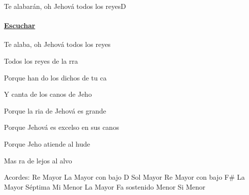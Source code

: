 \documentclass[12pt, spanish]{book}
\begin{document}
    \begin{song}{Te alabarán, oh Jehová todos los reyes}{D}
        {} %
        {}
        {} %
        {}
        \ifChordBk
        \paragraph{\mbox{}\hfill\protect\href{https://open.spotify.com/intl-es/track/0WdOF259XbU53KiczkpEBu}{Escuchar}\mbox{}\hfill}
        \fi

        \begin{SBOpGroup}
            Te alaba, oh Jehová todos los reyes

            Todos los reyes de la rra

            Porque han do los dichos de tu ca

            Y canta de los canos de Jeho
        \end{SBOpGroup}

        \begin{SBChorus}
            Porque la ria de Jehová es grande

            Porque Jehová es excelso en sus canos

            Porque Jeho atiende al hude

            Mas ra de lejos al alvo
        \end{SBChorus}

        \ifChordBk
        \begin{SBOpGroup}
            Acordes:\break
            \upchord{\D}\qquad Re Mayor \hfill
            \upchord{\AD}\qquad La Mayor con bajo D \hfill\null\break
            \upchord{\G}\qquad Sol Mayor \hfill
            \upchord{\DFs}\qquad Re Mayor con bajo F\# \hfill\null\break
            \upchord{\Aseven}\qquad La Mayor S\'eptima \hfill
            \upchord{\Em}\qquad Mi Menor \hfill\null\break
            \upchord{\A}\qquad La Mayor \hfill
            \upchord{\Fsm}Fa sostenido Menor \hfill\null\break
            \upchord{\Bm}\qquad Si Menor \hfill
        \end{SBOpGroup}
        \fi
    \end{song}
\end{document}

